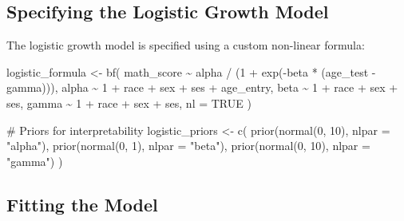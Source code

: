 \documentclass[
  letterpaper,
  DIV=11,
  numbers=noendperiod]{scrreprt}
\newenvironment{Shaded}{\begin{snugshade}}{\end{snugshade}}
\newcommand{\AttributeTok}[1]{\textcolor[rgb]{0.40,0.45,0.13}{#1}}
\newcommand{\CommentTok}[1]{\textcolor[rgb]{0.37,0.37,0.37}{#1}}
\newcommand{\ConstantTok}[1]{\textcolor[rgb]{0.56,0.35,0.01}{#1}}
\newcommand{\DecValTok}[1]{\textcolor[rgb]{0.68,0.00,0.00}{#1}}
\newcommand{\FunctionTok}[1]{\textcolor[rgb]{0.28,0.35,0.67}{#1}}
\newcommand{\NormalTok}[1]{\textcolor[rgb]{0.00,0.23,0.31}{#1}}
\newcommand{\OtherTok}[1]{\textcolor[rgb]{0.00,0.23,0.31}{#1}}
\newcommand{\SpecialCharTok}[1]{\textcolor[rgb]{0.37,0.37,0.37}{#1}}
\newcommand{\StringTok}[1]{\textcolor[rgb]{0.13,0.47,0.30}{#1}}
\begin{document}
\subsection{Specifying the Logistic Growth
Model}\label{specifying-the-logistic-growth-model}

The logistic growth model is specified using a custom non-linear
formula:

\begin{Shaded}
\begin{Highlighting}[]
\NormalTok{logistic\_formula }\OtherTok{\textless{}{-}} \FunctionTok{bf}\NormalTok{(}
\NormalTok{  math\_score }\SpecialCharTok{\textasciitilde{}}\NormalTok{ alpha }\SpecialCharTok{/}\NormalTok{ (}\DecValTok{1} \SpecialCharTok{+} \FunctionTok{exp}\NormalTok{(}\SpecialCharTok{{-}}\NormalTok{beta }\SpecialCharTok{*}\NormalTok{ (age\_test }\SpecialCharTok{{-}}\NormalTok{ gamma))),}
\NormalTok{  alpha }\SpecialCharTok{\textasciitilde{}} \DecValTok{1} \SpecialCharTok{+}\NormalTok{ race }\SpecialCharTok{+}\NormalTok{ sex }\SpecialCharTok{+}\NormalTok{ ses }\SpecialCharTok{+}\NormalTok{ age\_entry,}
\NormalTok{  beta }\SpecialCharTok{\textasciitilde{}} \DecValTok{1} \SpecialCharTok{+}\NormalTok{ race }\SpecialCharTok{+}\NormalTok{ sex }\SpecialCharTok{+}\NormalTok{ ses,}
\NormalTok{  gamma }\SpecialCharTok{\textasciitilde{}} \DecValTok{1} \SpecialCharTok{+}\NormalTok{ race }\SpecialCharTok{+}\NormalTok{ sex }\SpecialCharTok{+}\NormalTok{ ses,}
  \AttributeTok{nl =} \ConstantTok{TRUE}
\NormalTok{)}

\CommentTok{\# Priors for interpretability}
\NormalTok{logistic\_priors }\OtherTok{\textless{}{-}} \FunctionTok{c}\NormalTok{(}
  \FunctionTok{prior}\NormalTok{(}\FunctionTok{normal}\NormalTok{(}\DecValTok{0}\NormalTok{, }\DecValTok{10}\NormalTok{), }\AttributeTok{nlpar =} \StringTok{"alpha"}\NormalTok{),}
  \FunctionTok{prior}\NormalTok{(}\FunctionTok{normal}\NormalTok{(}\DecValTok{0}\NormalTok{, }\DecValTok{1}\NormalTok{), }\AttributeTok{nlpar =} \StringTok{"beta"}\NormalTok{),}
  \FunctionTok{prior}\NormalTok{(}\FunctionTok{normal}\NormalTok{(}\DecValTok{0}\NormalTok{, }\DecValTok{10}\NormalTok{), }\AttributeTok{nlpar =} \StringTok{"gamma"}\NormalTok{)}
\NormalTok{)}
\end{Highlighting}
\end{Shaded}

\subsection{Fitting the Model}\label{fitting-the-model}
\end{document}
